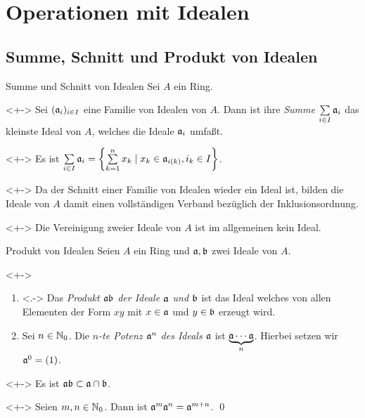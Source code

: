 \section{Operationen mit Idealen}

\subsection{Summe, Schnitt und Produkt von Idealen}

\begin{frame}{Summe und Schnitt von Idealen}
    Sei \(A\) ein Ring.
    \begin{definition}<+->
        Sei \((\mathfrak{a}_i)_{i \in I}\) eine Familie von Idealen von \(A\). Dann ist
        ihre \emph{Summe \(\sum\limits_{i \in I} \mathfrak{a}_i\)} das kleinste Ideal von
        \(A\), welches die Ideale \(\mathfrak{a}_i\) umfaßt.
    \end{definition}
    \begin{visibleenv}<+->
        Es ist \(\sum\limits_{i \in I} \mathfrak{a}_i = \left\{\sum\limits_{k = 1}^n x_k
        \mid x_k \in \mathfrak{a}_{i(k)}, i_k \in I\right\}\).
    \end{visibleenv}
    \begin{remark}<+->
        Da der Schnitt einer Familie von Idealen wieder ein Ideal ist, bilden die
        Ideale von \(A\) damit einen vollständigen Verband bezüglich der
        Inklusionsordnung.
    \end{remark}
    \begin{remark}<+->
        Die Vereinigung zweier Ideale von \(A\) ist im allgemeinen kein Ideal.
    \end{remark}
\end{frame}

\begin{frame}{Produkt von Idealen}
    Seien \(A\) ein Ring und \(\mathfrak{a}, \mathfrak{b}\) zwei Ideale von \(A\).
    \begin{definition}<+->
        \begin{enumerate}[<+->]
        \item<.->
            Das \emph{Produkt \(\mathfrak{a} \mathfrak{b}\) der Ideale \(\mathfrak{a}\)
            und \(\mathfrak{b}\)} ist das Ideal welches von allen Elementen der Form
            \(x y\) mit \(x \in \mathfrak{a}\) und \(y \in \mathfrak{b}\) erzeugt wird.
        \item
            Sei \(n \in \mathbb N_0\). Die \emph{\(n\)-te Potenz \(\mathfrak{a}^n\) des
            Ideals \(\mathfrak{a}\)} ist
            \(\underbrace{\mathfrak{a} \dotsm \mathfrak{a}}_{n}\). Hierbei setzen wir
            \(\mathfrak{a}^0 = (1)\).
        \end{enumerate}
    \end{definition}
    \begin{example}<+->
    	Es ist \(\mathfrak{a} \mathfrak{b} \subset \mathfrak{a} \cap \mathfrak{b}\).
    \end{example}
    \begin{proposition}<+->
        Seien \(m, n \in \mathbb N_0\). Dann ist
        \(\mathfrak{a}^m \mathfrak{a}^n = \mathfrak{a}^{m + n}\).
        \qed
    \end{proposition}
\end{frame}

